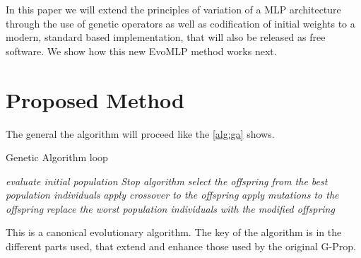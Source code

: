 \documentclass[runningheads]{llncs}
\begin{document}
\begin{itemize}
In this paper we will extend the principles of variation of a MLP
architecture through the use of genetic operators as well as
codification of initial weights to a modern, standard based
implementation, that will also be released as free software. We show
how this new {\sf EvoMLP} method works next.

\end{itemize}          %

\section{Proposed Method}
\label{method}

The general the algorithm will proceed like the \autoref{alg:ga} shows.

\begin{algorithm}
  \caption{Genetic Algorithm loop}\label{alg:ga}
  \begin{algorithmic}[1]
    \State \textit{evaluate initial population}
    \State \textit{Stop algorithm}
    \EndIf
    \State \textit{select the offspring from the best population individuals}
    \State \textit{apply crossover to the offspring}
    \State \textit{apply mutations to the offspring}
    \State \textit{replace the worst population individuals with the modified offspring}
    \EndWhile
  \end{algorithmic}
\end{algorithm}

This is a canonical evolutionary algorithm. The key of the algorithm is
in the different parts used, that extend and enhance those used by the
original G-Prop.
\end{document}
